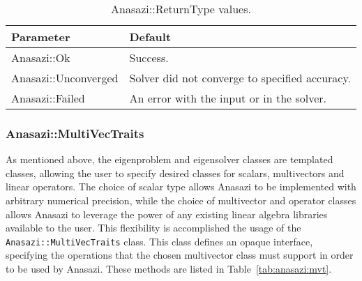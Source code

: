 \begin{table}
\begin{center}
\begin{tabular}{| p{4cm} l |}
\hline
Parameter & Default \\
\hline
Anasazi::Ok          & Success. \\
Anasazi::Unconverged & Solver did not converge to specified accuracy. \\
Anasazi::Failed      & An error with the input or in the solver. \\
\hline
\end{tabular}
\caption{Anasazi::ReturnType values.}
\label{tab:anasazi:rt}
\end{center}
\end{table}

\subsubsection{Anasazi::MultiVecTraits}
\label{sec:anasazi:mvt}

As mentioned above, the eigenproblem and eigensolver classes are templated
classes, allowing the user to specify desired classes for scalars, multivectors
and linear operators. The choice of scalar type allows Anasazi to be implemented
with arbitrary numerical precision, while the choice of multivector and operator
classes allows Anasazi to leverage the power of any existing linear algebra
libraries available to the user. This flexibility is accomplished the usage of
the \verb!Anasazi::MultiVecTraits! class. This class defines an opaque
interface, specifying the operations that the chosen multivector class must
support in order to be used by Anasazi. These methods are listed in
Table~\ref{tab:anasazi:mvt}.

